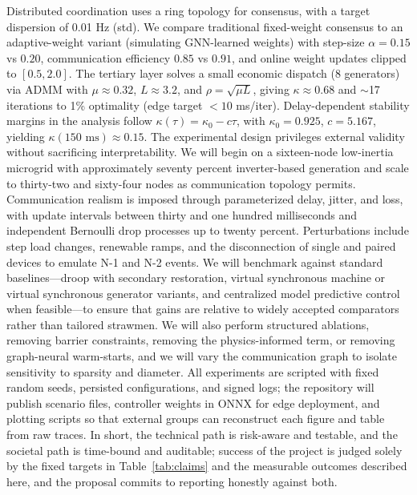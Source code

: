 \documentclass[12pt]{article}
\begin{document}
Distributed coordination uses a ring topology for consensus, with a target dispersion of 0.01 Hz (std). We compare traditional fixed-weight consensus to an adaptive-weight variant (simulating GNN-learned weights) with step-size $\alpha = 0.15$ vs $0.20$, communication efficiency $0.85$ vs $0.91$, and online weight updates clipped to $[0.5, 2.0]$. The tertiary layer solves a small economic dispatch (8 generators) via ADMM with $\mu \approx 0.32$, $L \approx 3.2$, and $\rho = \sqrt{\mu L}$, giving $\kappa \approx 0.68$ and $\sim$17 iterations to 1\% optimality (edge target $< 10$ ms/iter). Delay-dependent stability margins in the analysis follow $\kappa(\tau) = \kappa_0 - c\tau$, with $\kappa_0 = 0.925$, $c = 5.167$, yielding $\kappa(150\text{ ms}) \approx 0.15$.
The experimental design privileges external validity without sacrificing interpretability. We will begin on a sixteen-node low-inertia microgrid with approximately seventy percent inverter-based generation and scale to thirty-two and sixty-four nodes as communication topology permits. Communication realism is imposed through parameterized delay, jitter, and loss, with update intervals between thirty and one hundred milliseconds and independent Bernoulli drop processes up to twenty percent. Perturbations include step load changes, renewable ramps, and the disconnection of single and paired devices to emulate N-1 and N-2 events. We will benchmark against standard baselines---droop with secondary restoration, virtual synchronous machine or virtual synchronous generator variants, and centralized model predictive control when feasible---to ensure that gains are relative to widely accepted comparators rather than tailored strawmen. We will also perform structured ablations, removing barrier constraints, removing the physics-informed term, or removing graph-neural warm-starts, and we will vary the communication graph to isolate sensitivity to sparsity and diameter. All experiments are scripted with fixed random seeds, persisted configurations, and signed logs; the repository will publish scenario files, controller weights in ONNX for edge deployment, and plotting scripts so that external groups can reconstruct each figure and table from raw traces. In short, the technical path is risk-aware and testable, and the societal path is time-bound and auditable; success of the project is judged solely by the fixed targets in Table~\ref{tab:claims} and the measurable outcomes described here, and the proposal commits to reporting honestly against both.
\end{document}
